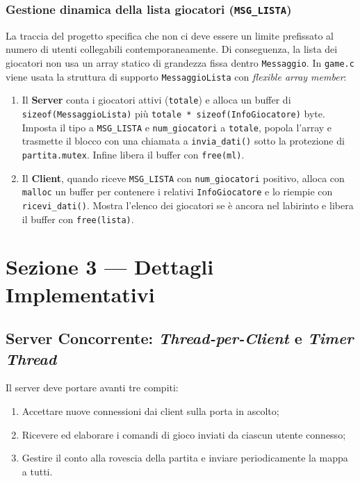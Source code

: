 \documentclass[11pt,a4paper]{article}
\begin{document}
\subsubsection{Gestione dinamica della lista giocatori (\texttt{MSG\_LISTA})}
La traccia del progetto specifica che non ci deve essere un limite prefissato al numero di utenti collegabili contemporaneamente. Di conseguenza, la lista dei giocatori non usa un array statico di grandezza fissa dentro \texttt{Messaggio}. In \texttt{game.c} viene usata la struttura di supporto \texttt{MessaggioLista} con \textit{flexible array member}:
\begin{enumerate}
    \item Il \textbf{Server} conta i giocatori attivi (\texttt{totale}) e alloca un buffer di \texttt{sizeof(MessaggioLista)} più \texttt{totale * sizeof(InfoGiocatore)} byte. Imposta il tipo a \texttt{MSG\_LISTA} e \texttt{num\_giocatori} a \texttt{totale}, popola l'array e trasmette il blocco con una chiamata a \texttt{invia\_dati()} sotto la protezione di \texttt{partita.mutex}. Infine libera il buffer con \texttt{free(ml)}.
    \item Il \textbf{Client}, quando riceve \texttt{MSG\_LISTA} con \texttt{num\_giocatori} positivo, alloca con \texttt{malloc} un buffer per contenere i relativi \texttt{InfoGiocatore} e lo riempie con \texttt{ricevi\_dati()}. Mostra l'elenco dei giocatori se è ancora nel labirinto e libera il buffer con \texttt{free(lista)}.
\end{enumerate}

\clearpage

\section{Sezione 3 --- Dettagli Implementativi}

\subsection{Server Concorrente: \textit{Thread-per-Client} e \textit{Timer Thread}}

Il server deve portare avanti tre compiti:
\begin{enumerate}
    \item Accettare nuove connessioni dai client sulla porta in ascolto;
    \item Ricevere ed elaborare i comandi di gioco inviati da ciascun utente connesso;
    \item Gestire il conto alla rovescia della partita e inviare periodicamente la mappa a tutti.
\end{enumerate}
\end{document}
